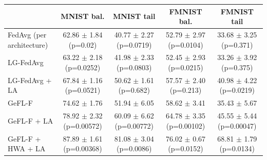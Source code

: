 \begin{tabular}{lcccc}
\toprule
 & MNIST bal. & MNIST tail & FMNIST bal. & FMNIST tail \\
\midrule
FedAvg (per architecture) & 62.86 $\pm$ 1.84 (p=0.02) & 40.77 $\pm$ 2.27 (p=0.0719) & 52.79 $\pm$ 2.97 (p=0.0104) & 33.68 $\pm$ 3.25 (p=0.371) \\
LG-FedAvg & 63.22 $\pm$ 2.18 (p=0.0252) & 41.98 $\pm$ 2.33 (p=0.0803) & 52.45 $\pm$ 2.93 (p=0.0215) & 33.26 $\pm$ 3.92 (p=0.375) \\
LG-FedAvg + LA & 67.84 $\pm$ 1.16 (p=0.0521) & 50.62 $\pm$ 1.61 (p=0.682) & 57.57 $\pm$ 2.40 (p=0.213) & 40.98 $\pm$ 4.22 (p=0.0219) \\
GeFL-F & 74.62 $\pm$ 1.76 & 51.94 $\pm$ 6.05 & 58.62 $\pm$ 3.41 & 35.43 $\pm$ 5.67 \\
GeFL-F + LA & 78.92 $\pm$ 2.32 (p=0.00572) & 60.09 $\pm$ 6.62 (p=0.00772) & 64.78 $\pm$ 3.35 (p=0.00102) & 45.55 $\pm$ 5.44 (p=0.00047) \\
GeFL-F + HWA + LA & 87.89 $\pm$ 1.61 (p=0.00368) & 81.08 $\pm$ 3.04 (p=0.0086) & 76.02 $\pm$ 0.67 (p=0.0152) & 68.81 $\pm$ 1.79 (p=0.0134) \\
\bottomrule
\end{tabular}
